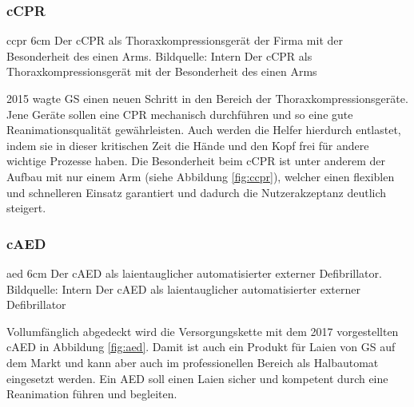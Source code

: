 \subsubsection{\acrlong*{cCPR}}
\bild
{ccpr}
{6cm}
{Der \acrlong{cCPR} als Thoraxkompressionsgerät der Firma mit der Besonderheit des einen Arms. Bildquelle: Intern}
{Der \acrlong*{cCPR} als Thoraxkompressionsgerät mit der Besonderheit des einen Arms}
\FloatBarrier

2015 wagte \gls{GS} einen neuen Schritt in den Bereich der Thoraxkompressionsgeräte. 
Jene Geräte sollen eine \glqq \gls{CPR}\grqq{} mechanisch durchführen und so eine gute Reanimationsqualität gewährleisten.
Auch werden die Helfer hierdurch entlastet, indem sie in dieser kritischen Zeit die Hände und den Kopf frei für andere wichtige Prozesse haben.
Die Besonderheit beim \gls{cCPR} ist unter anderem der Aufbau mit nur einem Arm (siehe Abbildung \ref{fig:ccpr}), welcher einen flexiblen und schnelleren Einsatz garantiert und dadurch die Nutzerakzeptanz deutlich steigert.


\subsubsection{\acrlong*{cAED}}
\bild
{aed}
{6cm}
{Der \acrlong{cAED} als laientauglicher automatisierter externer Defibrillator. Bildquelle: Intern}
{Der \acrlong*{cAED} als laientauglicher automatisierter externer Defibrillator}

Vollumfänglich abgedeckt wird die Versorgungskette mit dem 2017 vorgestellten \gls{cAED} in Abbildung \ref{fig:aed}.
Damit ist auch ein Produkt für Laien von \gls{GS} auf dem Markt und kann aber auch im professionellen Bereich als \glqq Halbautomat\grqq{} eingesetzt werden.
Ein \glqq \gls{AED}\grqq{} soll einen Laien sicher und kompetent durch eine Reanimation führen und begleiten.


